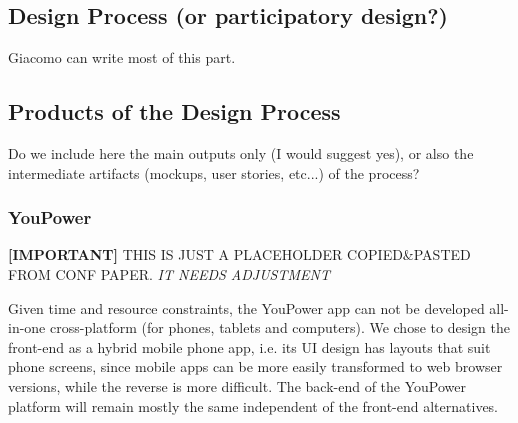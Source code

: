 \subsection{Design Process (or participatory design?)}

\begin{svgraybox}
[note by GP] Giacomo can write most of this part. 
\end{svgraybox}


\subsection{Products of the Design Process}
\begin{svgraybox}
[note by GP] Do we include here the main outputs only (I would suggest yes), or also the intermediate artifacts (mockups, user stories, etc...) of the process?
\end{svgraybox}

\subsubsection{YouPower} %
\begin{svgraybox}
\textbf{[IMPORTANT]} THIS IS JUST A PLACEHOLDER COPIED\&PASTED FROM CONF PAPER. \textit{IT NEEDS ADJUSTMENT}
\end{svgraybox}

\noindent Given time and resource constraints, the YouPower app can not be developed all-in-one cross-platform (for phones, tablets and computers). We chose to design the front-end as a hybrid mobile phone app, i.e. its UI design has layouts that suit phone screens, %
since mobile apps can be more easily transformed to web browser versions, while the reverse is more difficult.
The back-end of the YouPower platform will remain mostly the same independent of the front-end alternatives. 

